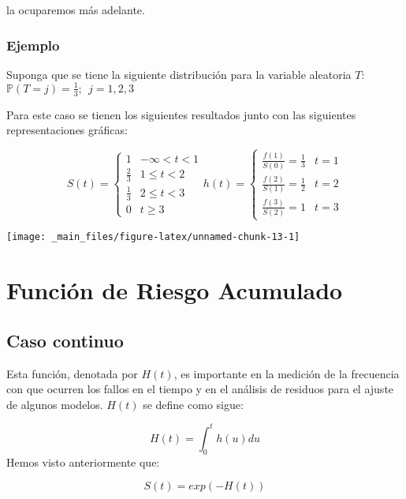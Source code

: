 \documentclass[
  a4paper,
  oneside,
  openany]{book}
\begin{document}
la ocuparemos más adelante.

\hypertarget{ejemplo-5}{%
\subsubsection*{Ejemplo}\label{ejemplo-5}}


Suponga que se tiene la siguiente distribución para la variable aleatoria \(T\): \(\mathbb{P}(T = j) = \frac{1}{3}; \ \ j = 1,2,3\)

Para este caso se tienen los siguientes resultados junto con las siguientes representaciones gráficas:

\[
S(t) = \left\{
\begin{array}{ll}
1 & -\infty<t<1\\
\frac{2}{3} &  1\leq t<2\\
\frac{1}{3} & 2\leq t < 3\\
0 & t\geq 3
\end{array}
\right.
h(t) = \left\{
\begin{array}{ll}
\frac{f(1)}{S(0)} = \frac{1}{3} & t = 1\\
\frac{f(2)}{S(1)} = \frac{1}{2} & t = 2\\
\frac{f(3)}{S(2)} = 1 & t = 3
\end{array}
\right.
\]

\begin{center}\texttt{[image: \_main\_files/figure-latex/unnamed-chunk-13-1]} \end{center}

\hypertarget{funciuxf3n-de-riesgo-acumulado}{%
\section{Función de Riesgo Acumulado}\label{funciuxf3n-de-riesgo-acumulado}}

\hypertarget{caso-continuo-2}{%
\subsection*{Caso continuo}\label{caso-continuo-2}}


Esta función, denotada por \(H(t)\), es importante en la medición de la frecuencia con que ocurren los fallos en el tiempo y en el análisis de residuos para el ajuste de algunos modelos. \(H(t)\) se define como sigue:

\[
H(t)=\int_{0}^{t}h(u)du
\]
Hemos visto anteriormente que:

\[
S(t)=exp(-H(t))
\]
\end{document}
